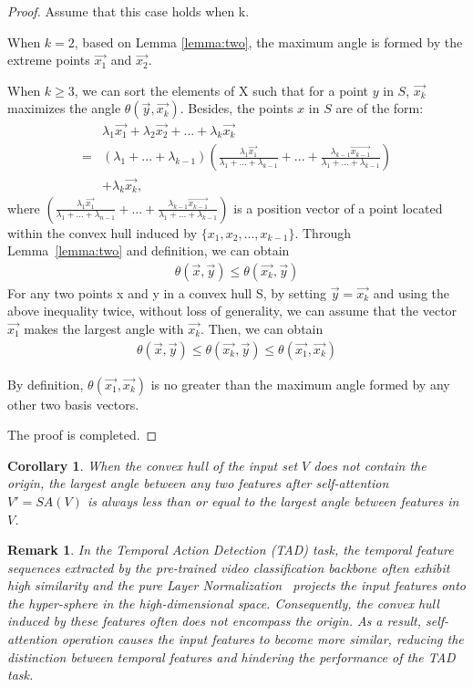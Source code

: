 \documentclass[10pt,twocolumn,letterpaper]{article}
\newtheorem{corollary}[theorem]{Corollary}
\newtheorem{proof}{Proof}[theorem]
\newtheorem{remark}{Remark}[theorem]
\begin{document}
\begin{proof}
Assume that this case holds when k.

When $k=2$, based on Lemma \ref{lemma:two}, the maximum angle is formed by the extreme points $\vec{x_1}$ and $\vec{x_2}$.

When $k\geq3$, we can sort the elements of X such that for a point $y$ in $S$, $\vec{x_k}$ maximizes the angle $\theta(\vec{y},\vec{x_k})$. Besides, the points $x$ in $S$ are of the form:
\begin{align*}
    &\lambda_1\vec{x_1}+\lambda_2\vec{x_2}+...+\lambda_k\vec{x_k}\\
    =&(\lambda_1+...+\lambda_{k-1})(\frac{\lambda_1 \vec{x_1}}{\lambda_1+...+\lambda_{k-1}}+...+\frac{\lambda_{k-1}\vec{x_{k-1}}}{\lambda_1+...+\lambda_{k-1}})\\
    &+\lambda_k\vec{x_k},
\end{align*}
where $(\frac{\lambda_1 \vec{x_1}}{\lambda_1+...+\lambda_{n-1}}+...+\frac{\lambda_{k-1}\vec{x_{k-1}}}{\lambda_1+...+\lambda_{k-1}})$ is a position vector of a point located within the convex hull induced by $\{x_1,x_2,...,x_{k-1}\}$. Through Lemma~\ref{lemma:two} and definition, we can obtain
\begin{align*}
    \theta(\vec{x},\vec{y})\leq\theta(\vec{x_k},\vec{y})
\end{align*}
For any two points x and y in a convex hull S, by setting $\vec{y}=\Vec{x_k}$ and using the above inequality twice, without loss of generality, we can assume that the vector $\vec{x_1}$ makes the largest angle with $\vec{x_k}$. Then, we can obtain
    \begin{align*}
    \theta(\vec{x},\vec{y})\leq\theta(\vec{x_k},\vec{y})\leq\theta(\vec{x_1},\vec{x_k})
\end{align*}

By definition, $\theta(\vec{x_1},\vec{x_k})$ is no greater than the maximum angle formed by any other two basis vectors.

The proof is completed.
\end{proof}

\begin{corollary}
When the convex hull of the input set $V$ does not contain the origin, the largest angle between any two features after self-attention $V' = SA(V)$ is always less than or equal to the largest angle between features in $V$.
\end{corollary}

\begin{remark}
In the Temporal Action Detection (TAD) task, the temporal feature sequences extracted by the pre-trained video classification backbone often exhibit high similarity and the pure Layer Normalization~\cite{ba2016layer} projects the input features onto the hyper-sphere in the high-dimensional space. Consequently, the convex hull induced by these features often does not encompass the origin. As a result, self-attention operation causes the input features to become more similar, reducing the distinction between temporal features and hindering the performance of the TAD task.
\end{remark}
\end{document}
